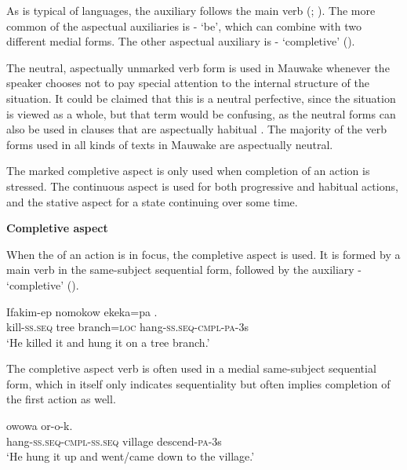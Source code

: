  As is typical of  languages, the auxiliary follows the main verb (\citealt[85]{Greenberg1966}; \citealt[90]{Dryer2007a}). The more common of the aspectual auxiliaries is - `be', which can combine with two different medial forms. The other aspectual auxiliary is - `completive' (). 

The neutral, aspectually unmarked verb form is used in Mauwake whenever the speaker chooses not to pay special attention to the internal structure of the situation. It could be claimed that this is a neutral perfective, since the situation is viewed as a whole, but that term would be confusing, as the neutral forms can also be used in clauses that are aspectually habitual \citep[cf.][239]{Payne1997}. The majority of the verb forms used in all kinds of texts in Mauwake are aspectually neutral.

The marked completive aspect is only used when completion of an action is stressed. The continuous aspect is used for both progressive and habitual actions, and the stative aspect for a state continuing over some time.

{\bfseries
{}
Completive aspect}

When the  of an action is in focus, the completive aspect is used. It is formed by a main verb in the same-subject sequential form, followed by the auxiliary - `completive' ().

\ea%
\label{ex:3:x361}
\gll Ifakim-ep nomokow ekeka=pa . \\
kill-\textsc{ss}.\textsc{seq} tree branch=\textsc{loc} hang-\textsc{ss}.\textsc{seq}-\textsc{cmpl}-\textsc{pa}-3s \\
\glt`He killed it and hung it on a tree branch.'
\z

The completive aspect verb is often used in a medial same-subject sequential form, which in itself only indicates sequentiality but often implies completion of the first action as well. 

\ea%
\label{ex:3:x362}
\gll {} owowa or-o-k. \\
hang-\textsc{ss}.\textsc{seq}-\textsc{cmpl}-\textsc{ss}.\textsc{seq} village descend-\textsc{pa}-3s\\
\glt`He hung it up and went/came down to the village.'
\z


